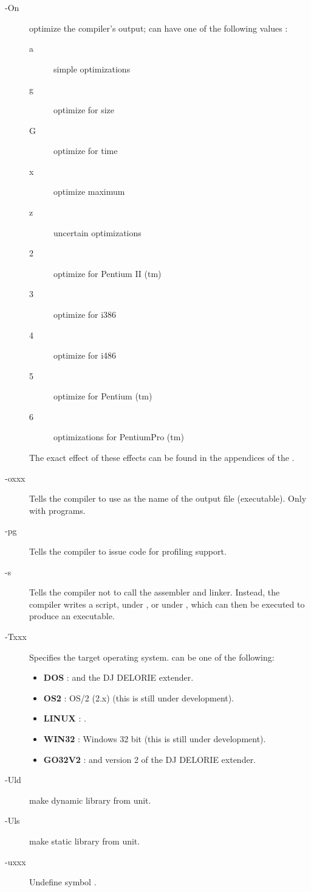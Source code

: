 \documentclass{report}
\newcommand{\olabel}[1]{\label{option:#1}}
\begin{document}
\begin{description}
\item[-On] \olabel{O} optimize the compiler's output;  can have one
of the following values :
\begin{description}
\item[a] simple optimizations
\item[g] optimize for size
\item[G] optimize for time
\item[x] optimize maximum
\item[z] uncertain optimizations
\item[2] optimize for Pentium II (tm)
\item[3] optimize for i386
\item[4] optimize for i486
\item[5] optimize for Pentium (tm)
\item[6] optimizations for PentiumPro (tm)
\end{description}
The exact effect of these effects can be found in the appendices of the 
\progref.
\item [-oxxx] Tells the compiler to use  as the name of the output
file (executable). Only with programs.
\item [-pg] Tells the compiler to issue code for profiling support.
\item [-s] \olabel{s} Tells the compiler not to call the assembler and linker.
Instead, the compiler writes a script,  under \dos, or
 under \linux, which can then be executed to produce an
executable.
\item[-Txxx] \olabel{T}Specifies the target operating system.  can be one of
the following:
\begin{itemize}
\item \textbf{DOS} : \dos and the DJ DELORIE extender.
\item \textbf{OS2} : OS/2 (2.x) (this is still under development).
\item \textbf{LINUX} : \linux.
\item \textbf{WIN32} : Windows 32 bit (this is still under development).
\item \textbf{GO32V2} : \dos and version 2 of the DJ DELORIE extender.
\end{itemize}
\item [-Uld] \olabel{Uld} make dynamic library from unit.
\item [-Uls] \olabel{Uls} make static library from unit.
\item [-uxxx] \olabel{U} Undefine symbol .

\end{description}
\end{document}
